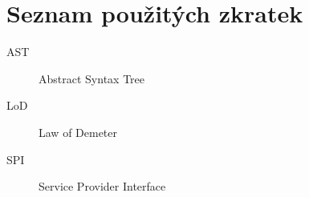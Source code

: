 \chapter{Seznam použitých zkratek}

\begin{description}
\item[AST] Abstract Syntax Tree
\item[LoD] Law of Demeter
\item[SPI] Service Provider Interface
\end{description}
